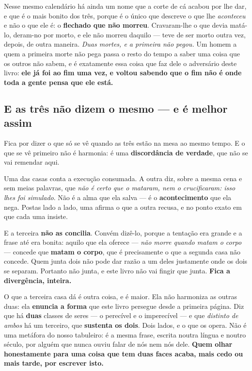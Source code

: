 \documentclass[livro.tex]{subfiles}
\begin{document}
\medskip
\noindent Nesse mesmo calendário há ainda um nome que a corte de cá acabou por lhe dar, e
que é o mais bonito dos três, porque é o único que descreve o que lhe \emph{aconteceu} e não
o que ele é: o \textbf{flechado que não morreu}. Cravaram-lhe o que devia matá-lo, deram-no
por morto, e ele não morreu daquilo --- teve de ser morto outra vez, depois, de outra
maneira. \emph{Duas mortes, e a primeira não pegou.} Um homem a quem a primeira morte não
pega passa o resto do tempo a saber uma coisa que os outros não sabem, e é exatamente essa
coisa que faz dele o adversário deste livro: \textbf{ele já foi ao fim uma vez, e voltou
sabendo que o fim não é onde toda a gente pensa que ele está.}

\subsection*{E as três não dizem o mesmo --- e é melhor assim}

Fica por dizer o que só se vê quando as três estão na mesa ao mesmo tempo. E o que se vê
primeiro não é harmonia: é uma \textbf{discordância de verdade}, que não se vai remendar aqui.

Uma das casas conta a execução consumada. A outra diz, sobre a mesma cena e sem meias
palavras, que \emph{não é certo que o mataram, nem o crucificaram: isso lhes foi simulado}.
Não é a alma que ela salva --- é o \textbf{acontecimento} que ela nega. Postas lado a lado,
uma afirma o que a outra recusa, e no ponto exato em que cada uma insiste.

E a terceira \textbf{não as concilia}. Convém dizê-lo, porque a tentação era grande e a frase
até era bonita: aquilo que ela oferece --- \emph{não morre quando matam o corpo} --- concede
que \textbf{matam o corpo}, que é precisamente o que a segunda casa não concede. Quem junta
dois não pode dar razão a um deles justamente onde os dois se separam. Portanto não junta, e
este livro não vai fingir que junta. \textbf{Fica a divergência, inteira.}

O que a terceira casa dá é outra coisa, e é maior. Ela não harmoniza as outras duas: ela
\textbf{enuncia a forma} que este livro persegue desde a primeira página. Diz que há
\textbf{duas} classes de seres --- o perecível e o imperecível --- e que \emph{distinto de
ambos} há um terceiro, que \textbf{sustenta os dois}. Dois lados, e o que os opera. Não é uma
metáfora do nosso tabuleiro: é a mesma frase, escrita noutra língua e noutro século, por
alguém que nunca ouviu falar de nós nem nós dele. \textbf{Quem olhar honestamente para uma
coisa que tem duas faces acaba, mais cedo ou mais tarde, por escrever isto.}
\end{document}
